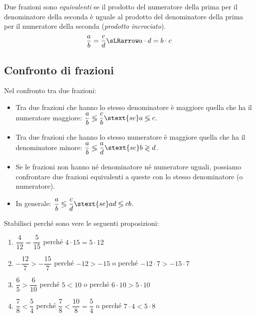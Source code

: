 \begin{definizione}{}{}
 Due frazioni sono \emph{equivalenti} se il prodotto del numeratore della 
prima per il denominatore della seconda è uguale al prodotto del 
denominatore della prima per il numeratore della 
seconda 
(\emph{prodotto incrociato}).
\[\frac{a}{b} = \frac{c}{d} \sLRarrow a \cdot d = b \cdot c\]
\end{definizione}

\subsection{Confronto di frazioni}
\label{sub:razionali_confronto}

\begin{definizione}{}{}
Nel confronto tra due frazioni:

\begin{itemize} [noitemsep]
\item Tra due frazioni che hanno lo stesso 
denominatore è maggiore quella 
che ha il numeratore maggiore: 
\(\dfrac{a}{b} \lessgtr \dfrac{c}{b} \stext{se} a \lessgtr c\).
\item Tra due frazioni che hanno lo stesso numeratore è maggiore quella 
che ha il denominatore minore: 
\(\dfrac{a}{b} \lessgtr \dfrac{a}{d} \stext{se} b \gtrless d\).
\item Se le frazioni non hanno né denominatore né numeratore uguali, 
possiamo confrontare due frazioni equivalenti a queste con lo stesso 
denominatore (o numeratore).
\item In generale: 
\(\dfrac{a}{b} \lessgtr \dfrac{c}{d} \stext{se} ad \lessgtr cb\).
\end{itemize}
\end{definizione}

\begin{esempi}{}{}
Stabilisci perché sono vere le seguenti proposizioni:
\begin{enumerate} [noitemsep]
\spazielenx
\item \(\dfrac{4}{12} = \dfrac{5}{15}\) \qquad perché 
\(4 \cdot 15 = 5 \cdot 12\) 
\item \(-\dfrac{12}{7} > -\dfrac{15}{7}\) \qquad perché 
\(-12 > -15\) \quad o perché \quad 
\(-12 \cdot 7 > -15 \cdot 7\)
\item \(\dfrac{6}{5} > \dfrac{6}{10}\) \qquad  perché 
\(5 < 10\) \quad o perché \quad 
\(6 \cdot 10 > 5 \cdot 10\)
\item \(\dfrac{7}{8} < \dfrac{5}{4}\) \qquad perché 
\(\dfrac{7}{8} < \dfrac{10}{8} = \dfrac{5}{4}\) \quad o perché \quad 
\(7 \cdot 4 < 5 \cdot 8\)
\end{enumerate}
\end{esempi}

